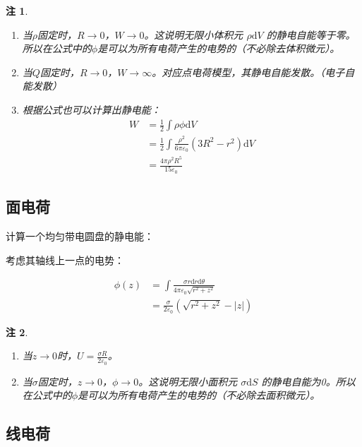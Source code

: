 \documentclass[12pt,onecolumn,a4paper]{book}
\newtheorem*{note}{注}
\numberwithin{table}{subsection}
\numberwithin{equation}{subsection}
\begin{document}
\begin{note}
    \begin{enumerate}
        \item 当$\rho$固定时，$R \rightarrow 0$，$W \rightarrow 0$。这说明无限小体积元 $\rho \mathrm{d} V$ 的静电自能等于零。所以在公式中的$\phi$是可以为所有电荷产生的电势的（不必除去体积微元）。
        \item 当$Q$固定时，$R \rightarrow 0$，$W \rightarrow \infty$。对应点电荷模型，其静电自能发散。（电子自能发散）
        \item 根据公式也可以计算出静电能：
              \begin{align}
                  W & = \frac{1}{2} \int \rho \phi \mathrm{d} V                                    \\
                    & = \frac{1}{2} \int  \frac{\rho^2}{6\pi\varepsilon_0} (3R^2-r^2) \mathrm{d} V \\
                    & = \frac{4\pi\rho^2 R^5}{15\varepsilon_0}
              \end{align}
    \end{enumerate}
\end{note}

\subsection{面电荷}

计算一个均匀带电圆盘的静电能：

考虑其轴线上一点的电势：

\begin{align}
    \phi(z) & = \int \frac{\sigma r \mathrm{d} r \mathrm{d} \theta}{4\pi\varepsilon_0 \sqrt{r^2+z^2}} \\
            & = \frac{\sigma}{2\varepsilon_0} (\sqrt{r^2+z^2} - |z|)
\end{align}

\begin{note}
    \begin{enumerate}
        \item 当$z\rightarrow 0$时，$U = \frac{\sigma R}{2 \varepsilon_0}$。
        \item 当$\sigma$固定时，$z \rightarrow 0$，$\phi \rightarrow 0$。这说明无限小面积元 $\sigma \mathrm{d} S$ 的静电自能为0。所以在公式中的$\phi$是可以为所有电荷产生的电势的（不必除去面积微元）。
    \end{enumerate}
\end{note}

\subsection{线电荷}
\end{document}
